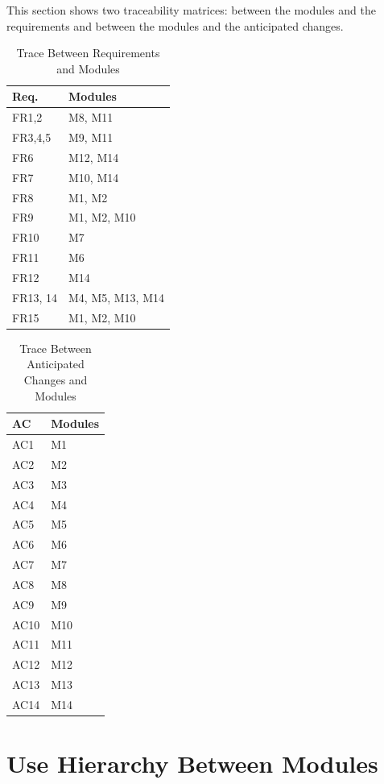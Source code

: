 \documentclass[12pt, titlepage]{article}
\begin{document}
This section shows two traceability matrices: between the modules and the
requirements and between the modules and the anticipated changes.

\begin{table}[H]
\centering
\begin{tabular}{p{} p{}}
\toprule
\textbf{Req.} & \textbf{Modules}\\
\midrule
FR1,2 & M8, M11\\
FR3,4,5 & M9, M11\\
FR6 & M12, M14\\
FR7 & M10, M14\\
FR8 & M1, M2\\
FR9 & M1, M2, M10\\
FR10 & M7\\
FR11 & M6\\
FR12 & M14\\
FR13, 14 & M4, M5, M13, M14\\
FR15 & M1, M2, M10\\
\bottomrule
\end{tabular}
\caption{Trace Between Requirements and Modules}
\label{TblRT}
\end{table}

\begin{table}[H]
\centering
\begin{tabular}{p{} p{}}
\toprule
\textbf{AC} & \textbf{Modules}\\
\midrule
AC1&M1\\
AC2&M2\\
AC3&M3\\
AC4&M4\\
AC5&M5\\
AC6&M6\\
AC7&M7\\ 
AC8&M8\\
AC9&M9\\
AC10&M10\\
AC11&M11\\
AC12&M12\\
AC13&M13\\
AC14&M14\\
\bottomrule
\end{tabular}
\caption{Trace Between Anticipated Changes and Modules}
\label{TblACT}
\end{table}

\section{Use Hierarchy Between Modules} \label{SecUse}
\end{document}
